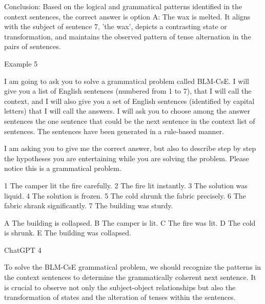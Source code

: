 Conclusion:
Based on the logical and grammatical patterns identified in the context sentences, the correct answer is option A: The wax is melted. It aligns with the subject of sentence 7, 'the wax', depicts a contrasting state or transformation, and maintains the observed pattern of tense alternation in the pairs of sentences.

Example 5

I am going to ask you to solve a grammatical problem called BLM-CsE.  I will give you a list of English sentences (numbered from 1 to 7), that I will call the context, and I will also give you a set of English sentences (identified by capital letters) that I will call  the answers. I will ask you to choose among the answer sentences the one sentence that could be the next sentence in the context list of sentences. The sentences have been generated in a rule-based manner. 

I am asking you to give me the correct answer, but also to describe step by step  the hypotheses you are entertaining while you are solving the problem. Please notice this is a grammatical problem.


1 The camper lit the fire carefully.
2 The fire lit instantly.
3 The solution was liquid.
4 The solution is frozen.
5 The cold shrunk the fabric precisely.
6 The fabric shrank significantly.
7 The building was sturdy.

A The building is collapsed.
B The camper is lit.
C The fire was lit.
D The cold is shrunk.
E The building was collapsed.


ChatGPT 4

To solve the BLM-CsE grammatical problem, we should recognize the patterns in the context sentences to determine the grammatically coherent next sentence. It is crucial to observe not only the subject-object relationships but also the transformation of states and the alteration of tenses within the sentences.

